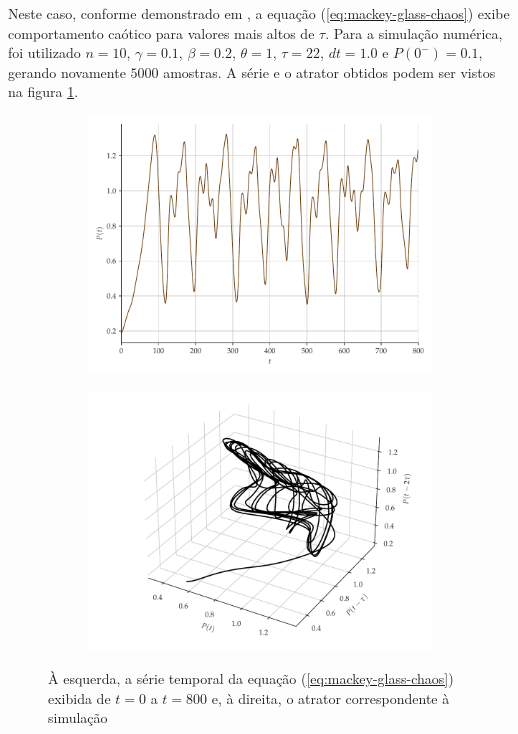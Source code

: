 \documentclass[a4paper, 12pt]{article}
\begin{document}
Neste caso, conforme demonstrado em \cite{mackey1977oscillation}, a equação (\ref{eq:mackey-glass-chaos}) exibe comportamento caótico para valores mais altos de $\tau$. Para a simulação numérica, foi utilizado $n = 10$, $\gamma = 0.1$, $\beta = 0.2$, $\theta = 1$, $\tau = 22$, $dt = 1.0$ e $P(0^-)=0.1$, gerando novamente $5000$ amostras. A série e o atrator obtidos podem ser vistos na figura \ref{fig:mackey-glass}.
\begin{figure}[H]
     \begin{subfigure}[t]{0.35\textwidth}
         \includegraphics[scale=0.35]{serie-mackeyglass.pdf}
     \end{subfigure}
     \centering
     \begin{subfigure}[t]{0.35\textwidth}
         \includegraphics[scale=0.35]{atrator-mackeyglass.pdf}
     \end{subfigure}
     \caption{À esquerda, a série temporal da equação (\ref{eq:mackey-glass-chaos}) exibida de $t = 0 $ a $t = 800$ e, à direita, o atrator correspondente à simulação}
     \label{fig:mackey-glass}
\end{figure}
\end{document}
